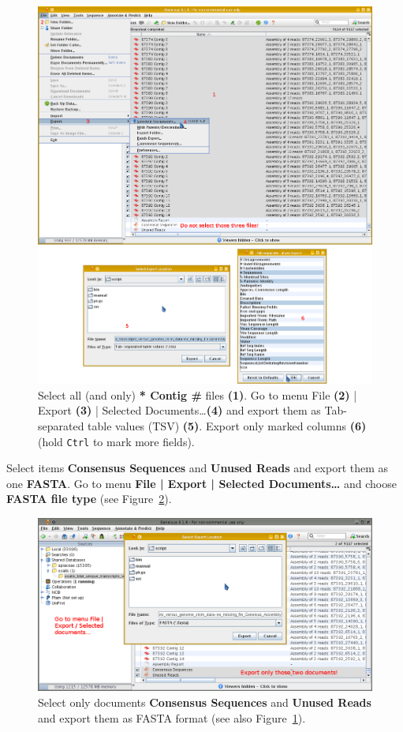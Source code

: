 \documentclass[a4paper, 11pt, twoside]{article}
\begin{document}
\begin{figure}[p]
  \includegraphics[width=\textwidth]{geneious3.png}
  \caption[Export of contigs as TSV from Geneious]{Select all (and only) \textbf{* Contig \#} files \textbf{(1)}. Go to menu File \textbf{(2)} | Export \textbf{(3)} | Selected Documents\ldots \textbf{(4)} and export them as Tab-separated table values (TSV) \textbf{(5)}. Export only marked columns \textbf{(6)} (hold \texttt{Ctrl} to mark more fields).}
  \label{geneious-export1}
\end{figure}

Select items \textbf{Consensus Sequences} and \textbf{Unused Reads} and export them as one \textbf{FASTA}. Go to menu \textbf{File | Export | Selected Documents\ldots} and choose \textbf{FASTA file type} (see Figure~\ref{geneious-export2}).

\begin{figure}[htb]
  \includegraphics[width=\textwidth]{geneious4.png}
  \caption[Export of FASTA from Geneious]{ Select only documents \textbf{Consensus Sequences} and \textbf{Unused Reads} and export them as FASTA format (see also Figure~\ref{geneious-export1}).}
  \label{geneious-export2}
\end{figure}
\end{document}
